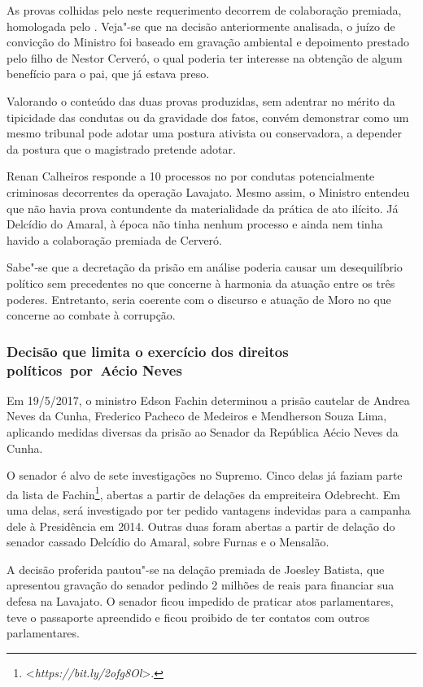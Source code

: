 As provas colhidas pelo  neste requerimento decorrem de colaboração
premiada, homologada pelo . Veja"-se que na decisão anteriormente
analisada, o juízo de convicção do Ministro foi baseado em gravação
ambiental e depoimento prestado pelo filho de Nestor Cerveró, o qual
poderia ter interesse na obtenção de algum benefício para o pai, que já
estava preso.

Valorando o conteúdo das duas provas produzidas, sem adentrar no mérito
da tipicidade das condutas ou da gravidade dos fatos, convém demonstrar
como um mesmo tribunal pode adotar uma postura ativista ou conservadora,
a depender da postura que o magistrado pretende adotar.

Renan Calheiros responde a 10 processos no  por condutas
potencialmente criminosas decorrentes da operação Lavajato. Mesmo
assim, o Ministro entendeu que não havia prova contundente da
materialidade da prática de ato ilícito. Já Delcídio do Amaral, à época
não tinha nenhum processo e ainda nem tinha havido a colaboração
premiada de Cerveró.

Sabe"-se que a decretação da prisão em análise poderia causar um
desequilíbrio político sem precedentes no que concerne à harmonia da
atuação entre os três poderes. Entretanto, seria coerente com o discurso
e atuação de Moro no que concerne ao combate à corrupção.

\subsubsection{Decisão que limita o exercício dos direitos políticos~por~Aécio Neves}

Em 19/5/2017, o ministro Edson Fachin determinou a prisão cautelar de
Andrea Neves da Cunha, Frederico Pacheco de Medeiros e Mendherson Souza
Lima, aplicando medidas diversas da prisão ao Senador da República Aécio
Neves da Cunha.

O senador é alvo de sete investigações no Supremo. Cinco delas já faziam
parte da lista de Fachin\footnote{\textless{}\emph{https://bit.ly/2ofg8Ol}\textgreater{}.}, abertas a partir de delações da empreiteira Odebrecht. Em uma delas, será investigado por ter pedido vantagens indevidas para a
campanha dele à Presidência em 2014. Outras duas foram abertas a partir
de delação do senador cassado Delcídio do Amaral, sobre Furnas e o
Mensalão.

A decisão proferida pautou"-se na delação premiada de Joesley Batista,
que apresentou gravação do senador pedindo 2 milhões de reais para
financiar sua defesa na Lavajato. O senador ficou impedido de praticar
atos parlamentares, teve o passaporte apreendido e ficou proibido de ter
contatos com outros parlamentares.

